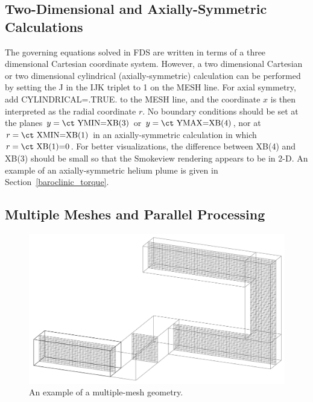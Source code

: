 \documentclass[11pt]{book}
\begin{document}
\subsection{Two-Dimensional and Axially-Symmetric Calculations}
\label{info:2D}

The governing equations solved in FDS are written in terms of a
three dimensional Cartesian coordinate system. However,
a two dimensional Cartesian or two dimensional cylindrical
(axially-symmetric) calculation can be performed by setting the {\ct J} in the {\ct IJK} triplet
to 1 on the {\ct MESH} line. For axial symmetry, add {\ct CYLINDRICAL=.TRUE.} to the
{\ct MESH} line, and the coordinate $x$ is then interpreted as the radial coordinate $r$.
No boundary conditions should be set at the planes $y=\hbox{\ct YMIN=XB(3)}$ or
$y=\hbox{\ct YMAX=XB(4)}$, nor at $r=\hbox{\ct XMIN=XB(1)}$ in an axially-symmetric
calculation in which $r=\hbox{\ct XB(1)=0}$. For better visualizations, the difference between
{\ct XB(4)} and {\ct XB(3)} should be small so that the Smokeview rendering appears to be in 2-D.
An example of an axially-symmetric helium plume is given in Section~\ref{baroclinic_torque}.


\subsection{Multiple Meshes and Parallel Processing}
\label{info:multimesh}


\begin{figure}[ht!]
\includegraphics[width=\textwidth]{FIGURES/hallways}
\caption{An example of a multiple-mesh geometry.}
\label{fig:domain}
\end{figure}
\end{document}
